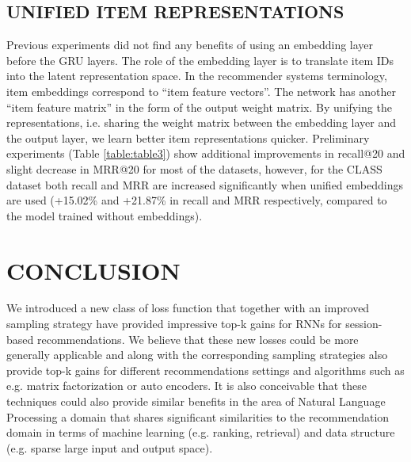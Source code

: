 \documentclass{article} %
\begin{document}
\subsection{UNIFIED ITEM REPRESENTATIONS}
Previous experiments did not find any benefits of using an embedding layer before the GRU layers. The role of the embedding layer is to translate item IDs into the latent representation space. In the recommender systems terminology, item embeddings correspond to “item feature vectors”. The network has another “item feature matrix” in the form of the output weight matrix. By unifying the representations, i.e. sharing the weight matrix between the embedding layer and the output layer, we learn better item representations quicker. Preliminary experiments (Table \ref{table:table3}) show additional improvements in recall@20 and slight decrease in MRR@20 for most of the datasets, however, for the CLASS dataset both recall and MRR are increased significantly when unified embeddings are used (+15.02\% and +21.87\% in recall and MRR respectively, compared to the model trained
without embeddings).



\label{headings}


\section{CONCLUSION}
We introduced a new class of loss function that together with an improved sampling strategy have provided impressive top-k gains for RNNs for session-based recommendations. We believe that these new losses could be more generally applicable and along with the corresponding sampling strategies also provide top-k gains for different recommendations settings and algorithms such as e.g. matrix factorization or auto encoders. It is also conceivable that these techniques could also provide similar benefits in the area of Natural Language Processing a domain that shares significant similarities to the recommendation domain in terms of machine learning (e.g. ranking, retrieval) and data structure (e.g. sparse large input and output space).





\appendix
\end{document}
